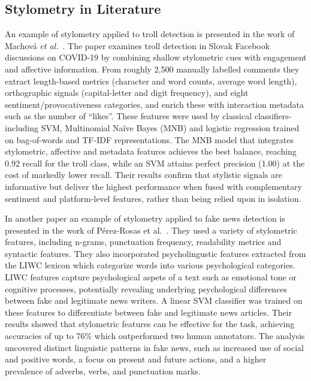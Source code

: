 \documentclass[twoside]{ctuthesis}
\theoremstyle{plain}
\theoremstyle{definition}
\theoremstyle{note}
\begin{document}
\subsection{Stylometry in Literature}

An example of stylometry applied to troll detection is presented in the work of Machová \textit{et al.}~\cite{Machova2021Algorithms}. The paper examines troll detection in Slovak Facebook discussions on COVID-19 by combining shallow stylometric cues with engagement and affective information.  From roughly 2,500 manually labelled comments they extract length-based metrics (character and word counts, average word length), orthographic signals (capital-letter and digit frequency), and eight sentiment/provocativeness categories, and enrich these with interaction metadata such as the number of “likes”. These features were used by classical classifiers-including SVM, Multinomial Naïve Bayes (MNB) and logistic regression trained on bag-of-words and TF-IDF representations. The MNB model that integrates stylometric, affective and metadata features achieves the best balance, reaching 0.92 recall for the troll class, while an SVM attains perfect precision (1.00) at the cost of markedly lower recall.  Their results confirm that stylistic signals are informative but deliver the highest performance when fused with complementary sentiment and platform-level features, rather than being relied upon in isolation.

In another paper an example of stylometry applied to fake news detection is presented in the work of Pérez-Rosas et al.~\cite{PerezRosas2018Stylometry}. They used a variety of stylometric features, including n-grams, punctuation frequency, readability metrics and syntactic features. They also incorporated psycholingustic features extracted from the LIWC lexicon which categorize words into various psychological categories. LIWC features capture psychological aspets of a text such as emotional tone or cognitive processes, potentially revealing underlying psychological differences between fake and legitimate news writers. A linear SVM classifier was trained on these features to differentiate between fake and legitimate news articles. Their results showed that stylometric features can be effective for the task, achieving accuracies of up to 76\% which outperformed two human annotators. The analysis uncovered distinct linguistic patterns in fake news, such as increased use of social and positive words, a focus on present and future actions, and a higher prevalence of adverbs, verbs, and punctuation marks. 
\end{document}
